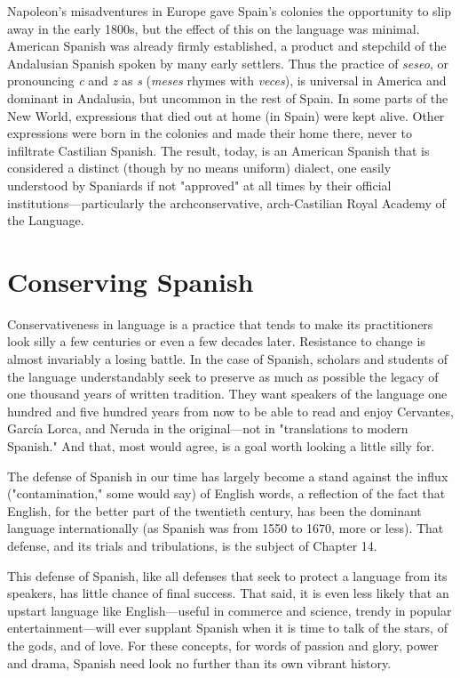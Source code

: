 Napoleon's misadventures in Europe gave Spain's colonies the
opportunity to slip away in the early 1800s, but the effect of this on
the language was minimal. American Spanish was already firmly established, a product and stepchild of the Andalusian Spanish spoken by
many early settlers. Thus the practice of \emph{seseo}, or pronouncing \emph{c} and \emph{z}
as \emph{s} (\emph{meses} rhymes with \emph{veces}), is universal in America and dominant
in Andalusia, but uncommon in the rest of Spain. In some parts of the
New World, expressions that died out at home (in Spain) were kept
alive. Other expressions were born in the colonies and made their
home there, never to infiltrate Castilian Spanish. The result, today, is
an American Spanish that is considered a distinct (though by no means
uniform) dialect, one easily understood by Spaniards if not "approved"
at all times by their official institutions---particularly the archconservative, arch-Castilian Royal Academy of the Language.

\section{Conserving Spanish}

Conservativeness in language is a practice that tends to make
its practitioners look silly a few centuries or even a few decades later.
Resistance to change is almost invariably a losing battle. In the case of
Spanish, scholars and students of the language understandably seek to
preserve as much as possible the legacy of one thousand years of written tradition. They want speakers of the language one hundred and five
hundred years from now to be able to read and enjoy Cervantes, García
Lorca, and Neruda in the original---not in "translations to modern
Spanish." And that, most would agree, is a goal worth looking a little
silly for.

The defense of Spanish in our time has largely become a stand
against the influx ("contamination," some would say) of English words,
a reflection of the fact that English, for the better part of the twentieth
century, has been the dominant language internationally (as Spanish
was from 1550 to 1670, more or less). That defense, and its trials and
tribulations, is the subject of Chapter 14.

This defense of Spanish, like all defenses that seek to protect a
language from its speakers, has little chance of final success. That said,
it is even less likely that an upstart language like English---useful in
commerce and science, trendy in popular entertainment---will ever
supplant Spanish when it is time to talk of the stars, of the gods, and
of love. For these concepts, for words of passion and glory, power and
drama, Spanish need look no further than its own vibrant history.

